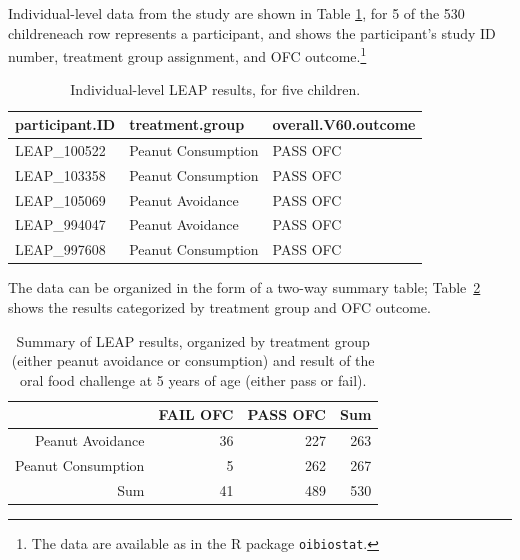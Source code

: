 Individual-level data from the study are shown in Table \ref{leapStudyResultsDF}, for 5 of the 530 children\textemdash each row represents a participant, and shows the participant's study ID number, treatment group assignment, and OFC outcome.\footnote{The data are available as  in the \textsf{R} package \texttt{oibiostat}.}
 

\begin{table}[ht]
\centering
\begin{tabular}{lll}
  \hline
participant.ID & treatment.group & overall.V60.outcome \\ 
  \hline
LEAP\_100522 & Peanut Consumption & PASS OFC \\ 
  LEAP\_103358 & Peanut Consumption & PASS OFC \\ 
  LEAP\_105069 & Peanut Avoidance & PASS OFC \\ 
  LEAP\_994047 & Peanut Avoidance & PASS OFC \\ 
  LEAP\_997608 & Peanut Consumption & PASS OFC \\ 
   \hline
\end{tabular}
\caption{Individual-level LEAP results, for five children.}
\label{leapStudyResultsDF}
\end{table}


The data can be organized in the form of a two-way summary table; Table~\ref{leapStudyResults} shows the results categorized by treatment group and OFC outcome. 

\begin{table}[ht]
\centering
\begin{tabular}{rrrr}
  \hline
 & FAIL OFC & PASS OFC & Sum \\ 
  \hline
Peanut Avoidance & 36 & 227 & 263 \\ 
  Peanut Consumption & 5 & 262 & 267 \\ 
  Sum & 41 & 489 & 530 \\ 
   \hline
\end{tabular}
\caption{Summary of LEAP results, organized by treatment group (either peanut avoidance or consumption) and result of the oral food challenge at 5 years of age (either pass or fail).} 
\label{leapStudyResults}
\end{table}


